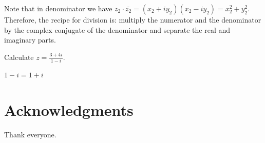 \documentclass[12pt]{article}
\providecommand{\BibLatexMode}[1]{}
\providecommand{\BibTexMode}[1]{}
\renewcommand{\BibLatexMode}[1]{}
\renewcommand{\BibTexMode}[1]{#1}
\renewcommand{\BibLatexMode}[1]{#1}
\renewcommand{\BibTexMode}[1]{}
\begin{document}
Note that in denominator we have $z_2\cdot \overline{z_2} = (x_2+iy_2)(x_2-iy_2) = x_2^2+y_2^2$. Therefore, the recipe for division is: multiply the numerator and the denominator by the complex conjugate of the denominator and separate the real and imaginary parts.
\begin{example}
   Calculate $z=\frac{3+4i}{1-i}$.
   \begin{soln}
      $\overline{1-i} = 1+i$
   \end{soln}
\end{example}
\section*{Acknowledgments}

Thank everyone.


\BibTexMode{%
   
   
}%
\BibLatexMode{\printbibliography}
\end{document}
